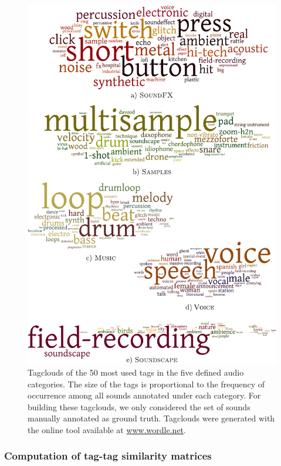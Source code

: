 \begin{figure}
	\centering
		\includegraphics[width=0.95\columnwidth]{ch04_class/pics/tagclouds2.pdf}
	\caption[Tagclouds of the 50 most used tags in the five defined audio categories]{Tagclouds of the 50 most used tags in the five defined audio categories. The size of the tags is proportional to the frequency of occurrence among all sounds annotated under each category. For building these tagclouds, we only considered the set of sounds manually annotated as ground truth. Tagclouds were generated with the online tool available at \url{www.wordle.net}.}
	\label{fig:tagclouds}
\end{figure}


\subsubsection{Computation of tag-tag similarity matrices} 
\label{class:sec:similarity_matrix_computation}

